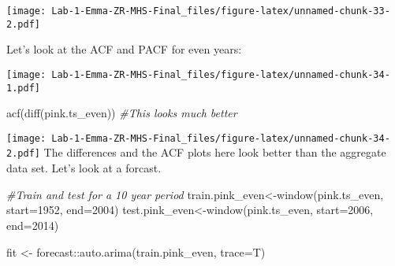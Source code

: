 \documentclass[
]{article}
\newenvironment{Shaded}{\begin{snugshade}}{\end{snugshade}}
\newcommand{\AttributeTok}[1]{\textcolor[rgb]{0.77,0.63,0.00}{#1}}
\newcommand{\CommentTok}[1]{\textcolor[rgb]{0.56,0.35,0.01}{\textit{#1}}}
\newcommand{\DecValTok}[1]{\textcolor[rgb]{0.00,0.00,0.81}{#1}}
\newcommand{\FloatTok}[1]{\textcolor[rgb]{0.00,0.00,0.81}{#1}}
\newcommand{\FunctionTok}[1]{\textcolor[rgb]{0.00,0.00,0.00}{#1}}
\newcommand{\NormalTok}[1]{#1}
\newcommand{\OtherTok}[1]{\textcolor[rgb]{0.56,0.35,0.01}{#1}}
\newcommand{\SpecialCharTok}[1]{\textcolor[rgb]{0.00,0.00,0.00}{#1}}
\begin{document}
\texttt{[image: Lab-1-Emma-ZR-MHS-Final\_files/figure-latex/unnamed-chunk-33-2.pdf]}

Let's look at the ACF and PACF for even years:

\begin{Shaded}
\end{Shaded}

\texttt{[image: Lab-1-Emma-ZR-MHS-Final\_files/figure-latex/unnamed-chunk-34-1.pdf]}

\begin{Shaded}
\begin{Highlighting}[]
\FunctionTok{acf}\NormalTok{(}\FunctionTok{diff}\NormalTok{(pink.ts\_even)) }\CommentTok{\#This looks much better}
\end{Highlighting}
\end{Shaded}

\texttt{[image: Lab-1-Emma-ZR-MHS-Final\_files/figure-latex/unnamed-chunk-34-2.pdf]}
The differences and the ACF plots here look better than the aggregate
data set. Let's look at a forcast.

\begin{Shaded}
\begin{Highlighting}[]
\CommentTok{\#Train and test for a 10 year period}
\NormalTok{train.pink\_even}\OtherTok{\textless{}{-}}\FunctionTok{window}\NormalTok{(pink.ts\_even, }\AttributeTok{start=}\DecValTok{1952}\NormalTok{, }\AttributeTok{end=}\DecValTok{2004}\NormalTok{)}
\NormalTok{test.pink\_even}\OtherTok{\textless{}{-}}\FunctionTok{window}\NormalTok{(pink.ts\_even, }\AttributeTok{start=}\DecValTok{2006}\NormalTok{, }\AttributeTok{end=}\DecValTok{2014}\NormalTok{)}

\NormalTok{fit }\OtherTok{\textless{}{-}}\NormalTok{ forecast}\SpecialCharTok{::}\FunctionTok{auto.arima}\NormalTok{(train.pink\_even, }\AttributeTok{trace=}\NormalTok{T)}
\end{Highlighting}
\end{Shaded}
\end{document}
